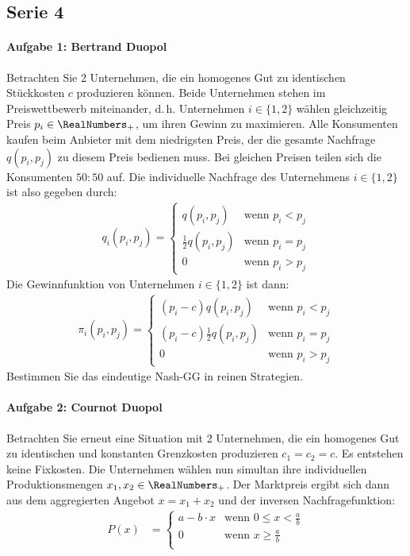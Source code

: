 \subsection{Serie 4}%
\label{sub:serie_4}

\paragraph{Aufgabe 1: Bertrand Duopol}%
\label{par:aufgabe_4_1}

Betrachten Sie 2 Unternehmen, die ein homogenes Gut zu identischen Stückkosten $c$
produzieren können.
Beide Unternehmen stehen im Preiswettbewerb miteinander, d.\,h. Unternehmen $i \in \{1,
2\}$ wählen gleichzeitig Preis $p_i \in \RealNumbers_+$, um ihren Gewinn zu maximieren.
Alle Konsumenten kaufen beim Anbieter mit dem niedrigsten Preis, der die gesamte Nachfrage
$q(p_i, p_j)$ zu diesem Preis bedienen muss.
Bei gleichen Preisen teilen sich die Konsumenten $50:50$ auf.
Die individuelle Nachfrage des Unternehmens $i \in \{1, 2\}$ ist also gegeben durch:
\begin{align*}
  q_i(p_i, p_j) =
  \begin{cases}
    q(p_i, p_j) & \text{wenn } p_i < p_j\\
    \frac{1}{2} q(p_i, p_j) & \text{wenn } p_i = p_j\\
    0 & \text{wenn } p_i > p_j
  \end{cases}
\end{align*}
Die Gewinnfunktion von Unternehmen $i \in \{1, 2\}$ ist dann:
\begin{align*}
  \pi_i(p_i, p_j) =
  \begin{cases}
    (p_i - c)q(p_i, p_j) & \text{wenn } p_i < p_j\\
    (p_i - c)\frac{1}{2} q(p_i, p_j) & \text{wenn } p_i = p_j\\
    0 & \text{wenn } p_i > p_j
  \end{cases}
\end{align*}
Bestimmen Sie das eindeutige Nash-GG in reinen Strategien.

\paragraph{Aufgabe 2: Cournot Duopol}%
\label{par:aufgabe_2_cournot_duopol}

Betrachten Sie erneut eine Situation mit 2 Unternehmen, die ein homogenes Gut zu
identischen und konstanten Grenzkosten produzieren $c_1 = c_2 = c$.
Es entstehen keine Fixkosten.
Die Unternehmen wählen nun simultan ihre individuellen Produktionsmengen $x_1, x_2 \in
\RealNumbers_+$.
Der Marktpreis ergibt sich dann aus dem aggregierten Angebot $x = x_1 + x_2$ und der
inversen Nachfragefunktion:
\begin{align*}
  P(x) & = \begin{cases}
    a - b \cdot x & \text{wenn } 0 \leq x < \frac{a}{b}\\
    0 & \text{wenn } x \geq \frac{a}{b}\\
  \end{cases}
\end{align*}
